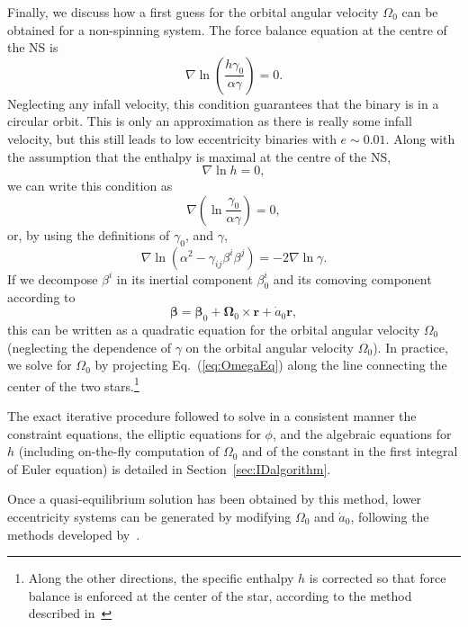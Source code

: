 Finally, we discuss how a first guess for the orbital angular velocity
$\Omega_0$ can be obtained for a non-spinning system. The force
balance equation at the centre of the NS is
\begin{equation}\label{eq:Nablah}
\nabla\ln\left({\frac{h\gamma_0}{\alpha\gamma}}\right)=0.
\end{equation}
Neglecting any infall velocity, this condition guarantees that the
binary is in a circular orbit. This is only an
approximation as there is really some infall velocity, but this still
leads to low eccentricity binaries with $e\sim 0.01$. 
Along with the assumption that the enthalpy is maximal at the centre of the NS,
\begin{equation}
\nabla\ln h=0,
\end{equation}
we can write this condition as
\begin{equation}
\nabla\left(\ln{\frac{\gamma_0}{\alpha\gamma}}\right)=0,
\end{equation}
or, by using the definitions of $\gamma_0$, and $\gamma$,
\begin{equation}
\nabla\ln\left(\alpha^2 - \gamma_{ij}\beta^{i}\beta^{j}\right) =
-2\nabla\ln{\gamma}.
\label{eq:OmegaEq}
\end{equation}
If we decompose $\beta^i$ in its inertial component $\beta^i_0$ and
its comoving component according to
\begin{equation}
{\bm \beta} = {\bm \beta}_0 + {\bm \Omega}_0 \times {\bm r} + \dot a_0
{\bm r},
\end{equation}
this can be written as a quadratic equation for the orbital angular
velocity $\Omega_0$ (neglecting the dependence of $\gamma$ on the
orbital angular velocity $\Omega_0$). In practice, we solve for
$\Omega_0$ by projecting Eq.~(\ref{eq:OmegaEq}) along the line
connecting the center of the two stars.\footnote{Along the other
  directions, the specific enthalpy $h$ is corrected so that force balance is
  enforced at the center of the star, according to the method
  described in~\cite{Foucart:2010eq}}

The exact iterative procedure followed to solve in a consistent manner
the constraint equations, the elliptic equations for $\phi$, and the
algebraic equations for $h$ (including on-the-fly computation of
$\Omega_0$ and of the constant in the first integral of Euler
equation) is detailed in Section~\ref{sec:IDalgorithm}.

Once a quasi-equilibrium solution has been obtained by this method,
lower eccentricity systems can be generated by modifying $\Omega_0$
and $\dot{a}_0$, following the methods developed by~\cite{Pfeiffer-Brown-etal:2007}.

